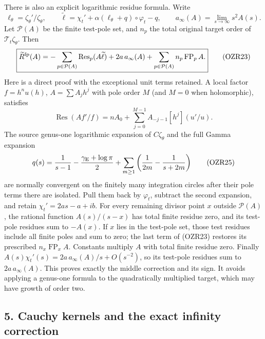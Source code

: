 \documentclass[
  10pt,
  a4paper,
]{article}
\begin{document}
There is also an explicit logarithmic residue formula. Write \[
\ell_\theta=\zeta_\theta'/\zeta_\theta,\qquad
\widetilde\ell=\chi_t'+\alpha(\ell_\theta+q)\circ\varphi_t-q,
\qquad a_\infty(A)=\lim_{s\to\infty}s^2A(s).
\tag{OZR22}
\] Let \(\mathcal P(A)\) be the finite test-pole set, and \(n_p\) the
total original target order of \(\mathcal T_t\zeta_\theta\). Then \[
\boxed{\widetilde R^{\rm fp}(A)=
-\sum_{p\in\mathcal P(A)}\operatorname{Res}_p(A\widetilde\ell)
 +2a\,a_\infty(A)
 +\sum_{p\in\mathcal P(A)}n_p\operatorname{FP}_p A.}
\tag{OZR23}
\] Here is a direct proof with the exceptional unit terms retained. A
local factor \(f=h^nu(h)\), \(A=\sum A_jh^j\) with pole order \(M\) (and
\(M=0\) when holomorphic), satisfies \[
\operatorname{Res}(Af'/f)=nA_0+
\sum_{j=0}^{M-1}A_{-j-1}[h^j](u'/u).
\tag{OZR24}
\] The source genus-one logarithmic expansion of \(C\zeta_\theta\) and
the full Gamma expansion \[
q(s)=\frac1{s-1}-\frac{\gamma_{\rm E}+\log\pi}{2}
 +\sum_{m\ge1}\left(\frac1{2m}-\frac1{s+2m}\right)
\tag{OZR25}
\] are normally convergent on the finitely many integration circles
after their pole terms there are isolated. Pull them back by
\(\varphi_t\), subtract the second expansion, and retain
\(\chi_t'=2as-a+ib\). For every remaining divisor point \(x\) outside
\(\mathcal P(A)\), the rational function \(A(s)/(s-x)\) has total finite
residue zero, and its test-pole residues sum to \(-A(x)\). If \(x\) lies
in the test-pole set, those test residues include all finite poles and
sum to zero; the last term of (OZR23) restores its prescribed
\(n_x\operatorname{FP}_xA\). Constants multiply \(A\) with total finite
residue zero. Finally \(A(s)\chi_t'(s)=2a\,a_\infty(A)/s+O(s^{-2})\), so
its test-pole residues sum to \(2a\,a_\infty(A)\). This proves exactly
the middle correction and its sign. It avoids applying a genus-one
formula to the quadratically multiplied target, which may have growth of
order two.

\subsection{5. Cauchy kernels and the exact infinity
correction}\label{cauchy-kernels-and-the-exact-infinity-correction}
\end{document}
